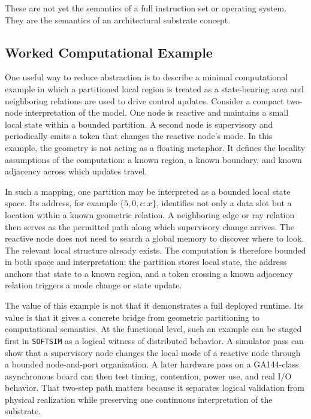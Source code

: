 \documentclass[11pt]{article}
\begin{document}
These are not yet the semantics of a full instruction set or operating system.
They are the semantics of an architectural substrate concept.

\subsection*{Worked Computational Example}

One useful way to reduce abstraction is to describe a minimal computational
example in which a partitioned local region is treated as a state-bearing area
and neighboring relations are used to drive control updates. Consider a compact
two-node interpretation of the model. One node is reactive and maintains a
small local state within a bounded partition. A second node is supervisory and
periodically emits a token that changes the reactive node's mode. In this
example, the geometry is not acting as a floating metaphor. It defines the
locality assumptions of the computation: a known region, a known boundary, and
known adjacency across which updates travel.

In such a mapping, one partition may be interpreted as a bounded local state
space. Its address, for example $\{5, 0, c : x\}$, identifies not only a data
slot but a location within a known geometric relation. A neighboring edge or
ray relation then serves as the permitted path along which supervisory change
arrives. The reactive node does not need to search a global memory to discover
where to look. The relevant local structure already exists. The computation is
therefore bounded in both space and interpretation: the partition stores local
state, the address anchors that state to a known region, and a token crossing a
known adjacency relation triggers a mode change or state update.

The value of this example is not that it demonstrates a full deployed runtime.
Its value is that it gives a concrete bridge from geometric partitioning to
computational semantics. At the functional level, such an example can be staged
first in \texttt{SOFTSIM} as a logical witness of distributed behavior. A
simulator pass can show that a supervisory node changes the local mode of a
reactive node through a bounded node-and-port organization. A later hardware
pass on a GA144-class asynchronous board can then test timing, contention,
power use, and real I/O behavior. That two-step path matters because it
separates logical validation from physical realization while preserving one
continuous interpretation of the substrate.
\end{document}

